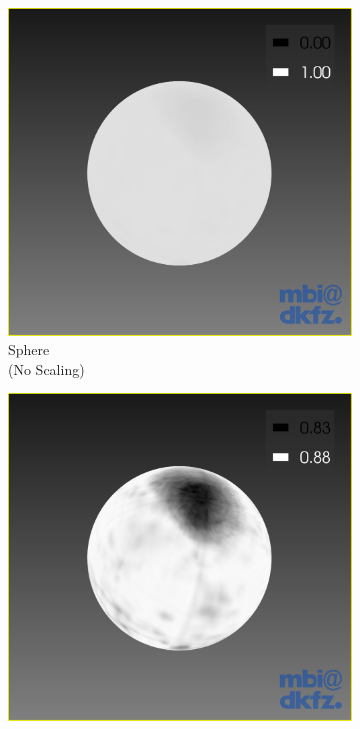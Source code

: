\begin{figure}[H]
  \centering
  \begin{subfigure}[b]{0.25\textwidth}
    \includegraphics[width=\textwidth]{images/surface/sphere_no_scaling.png}
    \caption*{Sphere\\(No Scaling)}
    \label{fig:surfacespherenoscaling}
  \end{subfigure}%
  \begin{subfigure}[b]{0.25\textwidth}
    \includegraphics[width=\textwidth]{images/surface/sphere_scaling.png}

\end{subfigure}
\end{figure}
